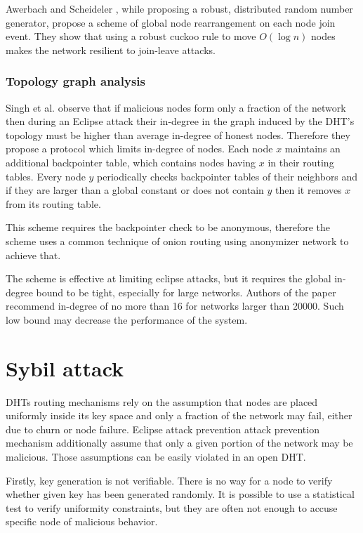   Awerbach and Scheideler \cite{awe10}, while proposing a robust, distributed
  random number generator, propose a scheme of global node rearrangement on each
  node join event. They show that using a robust cuckoo rule to move $O(\log n)$
  nodes makes the network resilient to join-leave attacks.

  \subsubsection{Topology graph analysis}
  Singh et al. \cite{sin06} observe that if malicious nodes form only a
  fraction of the network then during an Eclipse attack their in-degree in the
  graph induced by the DHT's topology must be higher than average in-degree of
  honest nodes. Therefore they propose a protocol which limits in-degree of
  nodes. Each node $x$ maintains an additional backpointer table, which contains
  nodes having $x$ in their routing tables. Every node $y$ periodically checks
  backpointer tables of their neighbors and if they are larger than a global
  constant or does not contain $y$ then it removes $x$ from its routing table.

  This scheme requires the backpointer check to be anonymous, therefore the
  scheme uses a common technique of onion routing using anonymizer network to
  achieve that.

  The scheme is effective at limiting eclipse attacks, but it requires the
  global in-degree bound to be tight, especially for large networks. Authors of
  the paper recommend in-degree of no more than 16 for networks larger than
  20000. Such low bound may decrease the performance of the system.

\section{Sybil attack}
  DHTs routing mechanisms rely on the assumption that nodes are placed uniformly
  inside its key space and only a fraction of the network may fail, either due
  to churn or node failure. Eclipse attack prevention attack prevention
  mechanism additionally assume that only a given portion of the network may be
  malicious. Those assumptions can be easily violated in an open DHT.

  Firstly, key generation is not verifiable. There is no way for a node to
  verify whether given key has been generated randomly. It is possible to use a
  statistical test to verify uniformity constraints, but they are often not
  enough to accuse specific node of malicious behavior.

